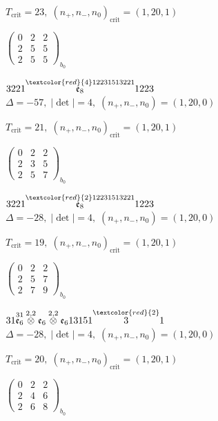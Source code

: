 \documentclass[10pt]{article}
\begin{document}
\hspace{1em}$T_{\text{crit}}=23,\; (n_+,n_-,n_0)_{\text{crit}}=(1,20,1)$

\hspace{2em}$\left(\begin{smallmatrix}0 & 2 & 2 \\ 2 & 5 & 5 \\ 2 & 5 & 5\end{smallmatrix}\right)_{\!b_0}$

\smallskip

$3221\overset{\textcolor{red}{4}12231513221}{\mathfrak{e}_8}1223$ \quad $\Delta=-57,\; |\det|=4,\; (n_+,n_-,n_0)=(1,20,0)$

\hspace{1em}$T_{\text{crit}}=21,\; (n_+,n_-,n_0)_{\text{crit}}=(1,20,1)$

\hspace{2em}$\left(\begin{smallmatrix}0 & 2 & 2 \\ 2 & 3 & 5 \\ 2 & 5 & 7\end{smallmatrix}\right)_{\!b_0}$

$3221\overset{\textcolor{red}{2}12231513221}{\mathfrak{e}_8}1223$ \quad $\Delta=-28,\; |\det|=4,\; (n_+,n_-,n_0)=(1,20,0)$

\hspace{1em}$T_{\text{crit}}=19,\; (n_+,n_-,n_0)_{\text{crit}}=(1,20,1)$

\hspace{2em}$\left(\begin{smallmatrix}0 & 2 & 2 \\ 2 & 5 & 7 \\ 2 & 7 & 9\end{smallmatrix}\right)_{\!b_0}$

\smallskip

$31\overset{31}{\mathfrak{e}_6}\overset{2,2}{\otimes}\mathfrak{e}_6\overset{2,2}{\otimes}\mathfrak{e}_613151\overset{\textcolor{red}{2}}{3}1$ \quad $\Delta=-28,\; |\det|=4,\; (n_+,n_-,n_0)=(1,20,0)$

\hspace{1em}$T_{\text{crit}}=20,\; (n_+,n_-,n_0)_{\text{crit}}=(1,20,1)$

\hspace{2em}$\left(\begin{smallmatrix}0 & 2 & 2 \\ 2 & 4 & 6 \\ 2 & 6 & 8\end{smallmatrix}\right)_{\!b_0}$
\end{document}
